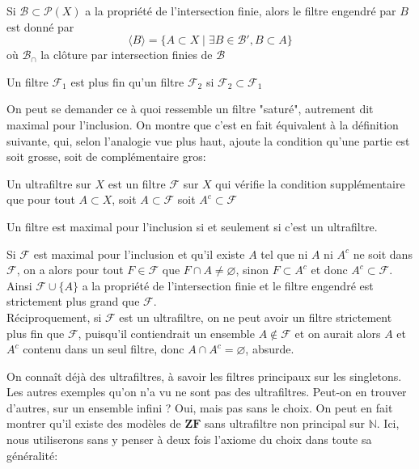 \documentclass{article}
\begin{document}
\begin{definition}
    Si $\mathcal{B} \subset \mathcal{P}(X)$ a la propriété de l'intersection finie, alors le filtre engendré par $B$ est donné par $$\langle B \rangle = \{A \subset X \mid \exists B \in \mathcal{B}', B \subset A\}$$
    où $\mathcal{B}_\cap$ la clôture par intersection finies de $\mathcal{B}$
\end{definition}

\begin{definition}
    Un filtre $\mathcal{F}_1$ est plus fin qu'un filtre $\mathcal{F}_2$ si $\mathcal{F}_2 \subset \mathcal{F}_1$
\end{definition}

On peut se demander ce à quoi ressemble un filtre "saturé", autrement dit maximal pour l'inclusion. On montre que c'est en fait équivalent à la définition suivante, qui, selon l'analogie vue plus haut, ajoute la condition qu'une partie est soit grosse, soit de complémentaire gros:

\begin{definition}
    Un ultrafiltre sur $X$ est un filtre $\mathcal{F}$ sur $X$ qui vérifie la condition supplémentaire que pour tout $A \subset X$, soit $A \subset \mathcal{F}$ soit $A^c \subset \mathcal{F}$
\end{definition}

\begin{proposition}
    Un filtre est maximal pour l'inclusion si et seulement si c'est un ultrafiltre.
\end{proposition}

\begin{preuve}
    Si $\mathcal{F}$ est maximal pour l'inclusion et qu'il existe $A$ tel que ni $A$ ni $A^c$ ne soit dans $\mathcal{F}$, on a alors pour tout $F \in \mathcal{F}$ que $F \cap A \neq \varnothing$, sinon $F \subset A^c$ et donc $A^c \subset \mathcal{F}$. Ainsi $\mathcal{F} \cup \{A\}$ a la propriété de l'intersection finie et le filtre engendré est strictement plus grand que $\mathcal{F}$.\\

    Réciproquement, si $\mathcal{F}$ est un ultrafiltre, on ne peut avoir un filtre strictement plus fin que $\mathcal{F}$, puisqu'il contiendrait un ensemble $A \not\in \mathcal{F}$ et on aurait alors $A$ et $A^c$ contenu dans un seul filtre, donc $A \cap A^c = \varnothing$, absurde.\\
\end{preuve}

On connaît déjà des ultrafiltres, à savoir les filtres principaux sur les singletons. Les autres exemples qu'on n'a vu ne sont pas des ultrafiltres. Peut-on en trouver d'autres, sur un ensemble infini ? Oui, mais pas sans le choix. On peut en fait montrer qu'il existe des modèles de $\mathbf{ZF}$ sans ultrafiltre non principal sur $\mathbb{N}$. Ici, nous utiliserons sans y penser à deux fois l'axiome du choix dans toute sa généralité:
\end{document}
